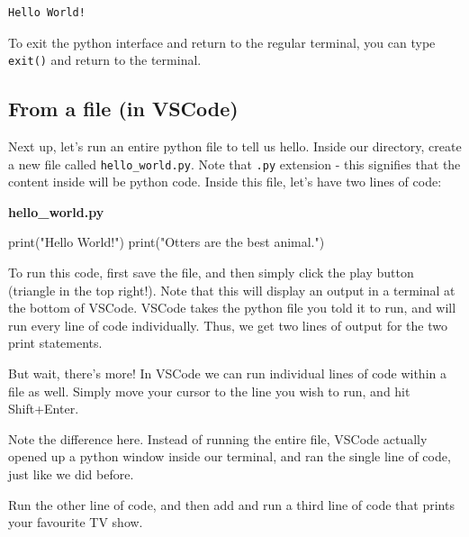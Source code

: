 \documentclass[
  letterpaper,
  DIV=11,
  numbers=noendperiod]{scrreprt}
\newenvironment{Shaded}{\begin{snugshade}}{\end{snugshade}}
\newcommand{\BuiltInTok}[1]{\textcolor[rgb]{0.00,0.23,0.31}{#1}}
\newcommand{\NormalTok}[1]{\textcolor[rgb]{0.00,0.23,0.31}{#1}}
\newcommand{\StringTok}[1]{\textcolor[rgb]{0.13,0.47,0.30}{#1}}
\begin{document}
\begin{verbatim}
Hello World!
\end{verbatim}

To exit the python interface and return to the regular terminal, you can
type \texttt{exit()} and return to the terminal.

\hypertarget{from-a-file-in-vscode}{%
\subsection{From a file (in VSCode)}\label{from-a-file-in-vscode}}

Next up, let's run an entire python file to tell us hello. Inside our
directory, create a new file called \texttt{hello\_world.py}. Note that
\texttt{.py} extension - this signifies that the content inside will be
python code. Inside this file, let's have two lines of code:

\textbf{hello\_world.py}

\begin{Shaded}
\begin{Highlighting}[]
\BuiltInTok{print}\NormalTok{(}\StringTok{"Hello World!"}\NormalTok{)}
\BuiltInTok{print}\NormalTok{(}\StringTok{"Otters are the best animal."}\NormalTok{)}
\end{Highlighting}
\end{Shaded}

To run this code, first save the file, and then simply click the play
button (triangle in the top right!). Note that this will display an
output in a terminal at the bottom of VSCode. VSCode takes the python
file you told it to run, and will run every line of code individually.
Thus, we get two lines of output for the two print statements.

But wait, there's more! In VSCode we can run individual lines of code
within a file as well. Simply move your cursor to the line you wish to
run, and hit Shift+Enter.

Note the difference here. Instead of running the entire file, VSCode
actually opened up a python window inside our terminal, and ran the
single line of code, just like we did before.

\begin{tcolorbox}[enhanced jigsaw, rightrule=.15mm, opacitybacktitle=0.6, colback=white, toprule=.15mm, colframe=quarto-callout-warning-color-frame, bottomtitle=1mm, bottomrule=.15mm, arc=.35mm, coltitle=black, breakable, title={Challenge 1}, titlerule=0mm, opacityback=0, colbacktitle=quarto-callout-warning-color!10!white, left=2mm, toptitle=1mm, leftrule=.75mm]
Run the other line of code, and then add and run a third line of code
that prints your favourite TV show.
\end{tcolorbox}
\end{document}
